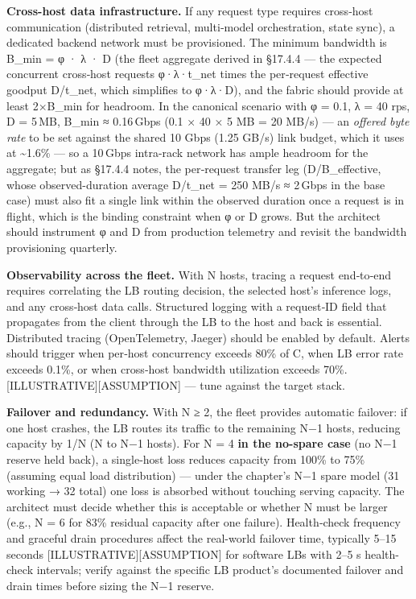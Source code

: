 \textbf{Cross-host data infrastructure.} If any request type requires
cross‑host communication (distributed retrieval, multi‑model
orchestration, state sync), a dedicated backend network must be
provisioned. The minimum bandwidth is B\_min = φ · λ · D (the fleet
aggregate derived in §17.4.4 --- the expected concurrent cross‑host
requests φ·λ·t\_net times the per‑request effective goodput D/t\_net,
which simplifies to φ·λ·D), and the fabric should provide at least
2×B\_min for headroom. In the canonical scenario with φ = 0.1, λ = 40
rps, D = 5\,MB, B\_min ≈ 0.16\,Gbps (0.1 × 40 × 5 MB = 20 MB/s) --- an
\emph{offered byte rate} to be set against the shared 10 Gbps (1.25
GB/s) link budget, which it uses at \textasciitilde1.6\% --- so a
10\,Gbps intra-rack network has ample headroom for the aggregate; but as
§17.4.4 notes, the per‑request transfer leg (D/B\_effective, whose
observed-duration average D/t\_net = 250 MB/s ≈ 2\,Gbps in the base
case) must also fit a single link within the observed duration once a
request is in flight, which is the binding constraint when φ or D grows.
But the architect should instrument φ and D from production telemetry
and revisit the bandwidth provisioning quarterly.

\textbf{Observability across the fleet.} With N hosts, tracing a request
end‑to‑end requires correlating the LB routing decision, the selected
host's inference logs, and any cross‑host data calls. Structured logging
with a request‑ID field that propagates from the client through the LB
to the host and back is essential. Distributed tracing (OpenTelemetry,
Jaeger) should be enabled by default. Alerts should trigger when
per‑host concurrency exceeds 80\% of C, when LB error rate exceeds
0.1\%, or when cross‑host bandwidth utilization exceeds 70\%.
\mbox{{[}ILLUSTRATIVE{]}}\hspace{0pt}\mbox{{[}ASSUMPTION{]}} --- tune against the target stack.

\textbf{Failover and redundancy.} With N ≥ 2, the fleet provides
automatic failover: if one host crashes, the LB routes its traffic to
the remaining N−1 hosts, reducing capacity by 1/N (N to N−1 hosts). For
N = 4 \textbf{in the no-spare case} (no N−1 reserve held back), a
single‑host loss reduces capacity from 100\% to 75\% (assuming equal
load distribution) --- under the chapter's N−1 spare model (31 working →
32 total) one loss is absorbed without touching serving capacity. The
architect must decide whether this is acceptable or whether N must be
larger (e.g., N = 6 for 83\% residual capacity after one failure).
Health‑check frequency and graceful drain procedures affect the
real-world failover time, typically 5--15 seconds
\mbox{{[}ILLUSTRATIVE{]}}\hspace{0pt}\mbox{{[}ASSUMPTION{]}} for software LBs with 2--5 s
health-check intervals; verify against the specific LB product's
documented failover and drain times before sizing the N−1 reserve.

